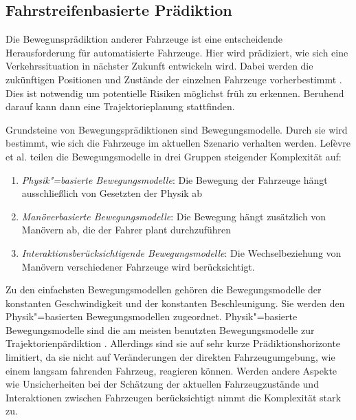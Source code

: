 \subsection{Fahrstreifenbasierte Pr\"adiktion}
\label{sec:IDMpred}
Die Bewegunspr\"adiktion anderer Fahrzeuge ist eine entscheidende Herausforderung f\"ur automatisierte Fahrzeuge.
Hier wird pr\"adiziert, wie sich eine Verkehrssituation in n\"achster Zukunft entwickeln wird.
Dabei werden die zuk\"unftigen Positionen und Zust\"ande der einzelnen Fahrzeuge vorherbestimmt \cite{Hermes2009}.
Dies ist notwendig um potentielle Risiken m\"oglichst fr\"uh zu erkennen.
Beruhend darauf kann dann eine Trajektorieplanung stattfinden.

Grundsteine von Bewegungspr\"adiktionen sind Bewegungsmodelle.
Durch sie wird bestimmt, wie sich die Fahrzeuge im aktuellen Szenario verhalten werden.
Lef\`{e}vre et al. \cite{Lefevre2014} teilen die Bewegungsmodelle in drei Gruppen steigender Komplexit\"at auf:

\begin{enumerate}
\item \textit{Physik"=basierte Bewegungsmodelle}: Die Bewegung der Fahrzeuge h\"angt ausschlie{\ss}lich von Gesetzten der Physik ab
\item \textit{Man\"overbasierte Bewegungsmodelle}: Die Bewegung h\"angt zus\"atzlich von Man\"overn ab, die der Fahrer plant durchzuf\"uhren
\item \textit{Interaktionsber\"ucksichtigende Bewegungsmodelle}: Die Wechselbeziehung von Man\"overn verschiedener Fahrzeuge wird ber\"ucksichtigt.
\end{enumerate}

Zu den einfachsten Bewegungsmodellen geh\"oren die Bewegungsmodelle der konstanten Geschwindigkeit und der konstanten Beschleunigung.
Sie werden den Physik"=basierten Bewegungsmodellen zugeordnet.
Physik"=basierte Bewegungsmodelle sind die am meisten benutzten Bewegungsmodelle zur Trajektorienp\"ardiktion \cite{Lefevre2014}.
Allerdings sind sie auf sehr kurze Pr\"adiktionshorizonte limitiert, da sie nicht auf Ver\"anderungen der direkten Fahrzeugumgebung, wie einem langsam fahrenden Fahrzeug, reagieren k\"onnen.
Werden andere Aspekte wie Unsicherheiten bei der Sch\"atzung der aktuellen Fahrzeugzust\"ande und Interaktionen zwischen Fahrzeugen ber\"ucksichtigt nimmt die Komplexit\"at stark zu.

